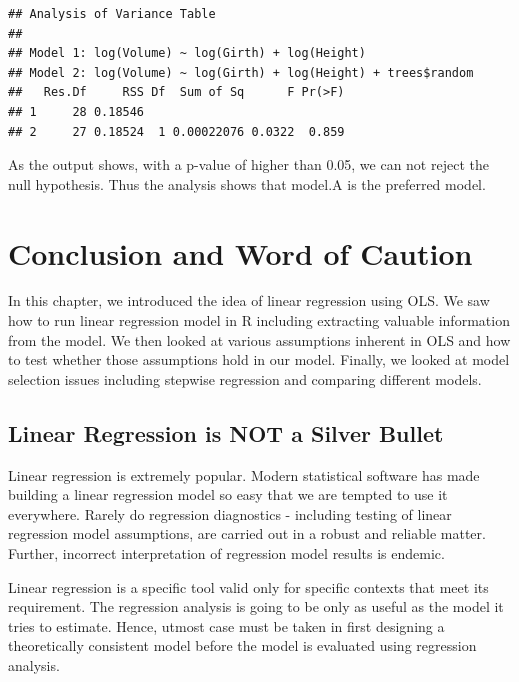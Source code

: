 \documentclass[10pt, letterpaper, twoside]{memoir}\usepackage{knitr}
\begin{document}
\begin{knitrout}
\color{fgcolor}\begin{kframe}
\begin{alltt}
\end{alltt}
\begin{verbatim}
## Analysis of Variance Table
## 
## Model 1: log(Volume) ~ log(Girth) + log(Height)
## Model 2: log(Volume) ~ log(Girth) + log(Height) + trees$random
##   Res.Df     RSS Df  Sum of Sq      F Pr(>F)
## 1     28 0.18546                            
## 2     27 0.18524  1 0.00022076 0.0322  0.859
\end{verbatim}
\end{kframe}
\end{knitrout}

As the output shows, with a p-value of higher than 0.05, we can not reject the null hypothesis. Thus the analysis shows that model.A is the preferred model.


\section{Conclusion and Word of Caution}

In this chapter, we introduced the idea of linear regression using OLS. We saw how to run linear regression model in R including extracting valuable information from the model. We then looked at various assumptions inherent in  OLS and how to test whether those assumptions hold in our model. Finally, we looked at model selection issues including stepwise regression and comparing different models.

\subsection{Linear Regression is NOT a Silver Bullet}

Linear regression is extremely popular. Modern statistical software has made building a linear regression model so easy that we are tempted to use it everywhere. Rarely do regression diagnostics - including testing of linear regression model assumptions, are carried out in a robust and reliable matter. Further, incorrect interpretation of regression model results is endemic. 

Linear regression is a specific tool valid only for specific contexts that meet its requirement. The regression analysis is going to be only as useful as the model it tries to estimate. Hence, utmost case must be taken in first designing a theoretically consistent model before the model is evaluated using regression analysis.
\end{document}
